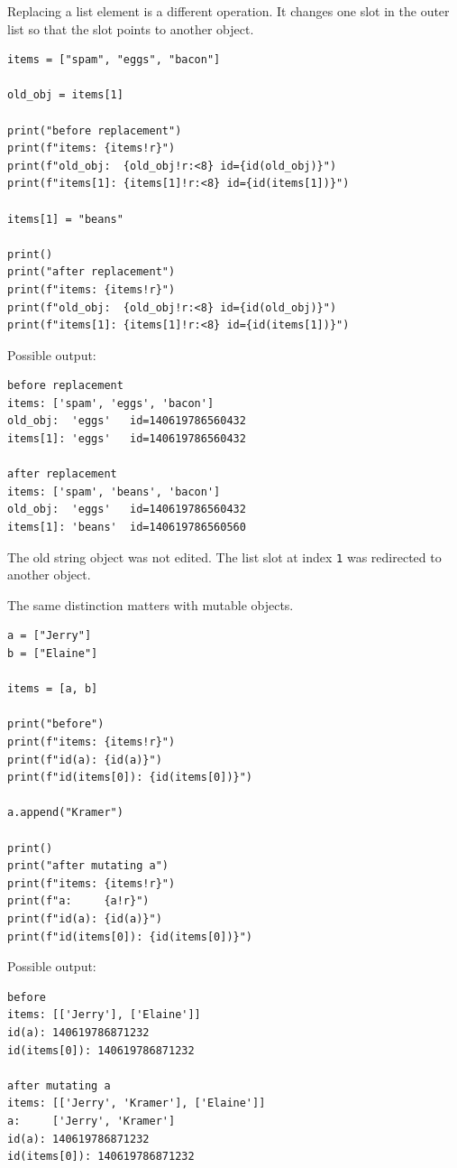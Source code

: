 Replacing a list element is a different operation. It changes one slot in the outer list so that the slot points to another object.

\begin{verbatim}
items = ["spam", "eggs", "bacon"]

old_obj = items[1]

print("before replacement")
print(f"items: {items!r}")
print(f"old_obj:  {old_obj!r:<8} id={id(old_obj)}")
print(f"items[1]: {items[1]!r:<8} id={id(items[1])}")

items[1] = "beans"

print()
print("after replacement")
print(f"items: {items!r}")
print(f"old_obj:  {old_obj!r:<8} id={id(old_obj)}")
print(f"items[1]: {items[1]!r:<8} id={id(items[1])}")
\end{verbatim}

Possible output:

\begin{verbatim}
before replacement
items: ['spam', 'eggs', 'bacon']
old_obj:  'eggs'   id=140619786560432
items[1]: 'eggs'   id=140619786560432

after replacement
items: ['spam', 'beans', 'bacon']
old_obj:  'eggs'   id=140619786560432
items[1]: 'beans'  id=140619786560560
\end{verbatim}

The old string object was not edited. The list slot at index \texttt{1} was redirected to another object.

The same distinction matters with mutable objects.

\begin{verbatim}
a = ["Jerry"]
b = ["Elaine"]

items = [a, b]

print("before")
print(f"items: {items!r}")
print(f"id(a): {id(a)}")
print(f"id(items[0]): {id(items[0])}")

a.append("Kramer")

print()
print("after mutating a")
print(f"items: {items!r}")
print(f"a:     {a!r}")
print(f"id(a): {id(a)}")
print(f"id(items[0]): {id(items[0])}")
\end{verbatim}

Possible output:

\begin{verbatim}
before
items: [['Jerry'], ['Elaine']]
id(a): 140619786871232
id(items[0]): 140619786871232

after mutating a
items: [['Jerry', 'Kramer'], ['Elaine']]
a:     ['Jerry', 'Kramer']
id(a): 140619786871232
id(items[0]): 140619786871232
\end{verbatim}

